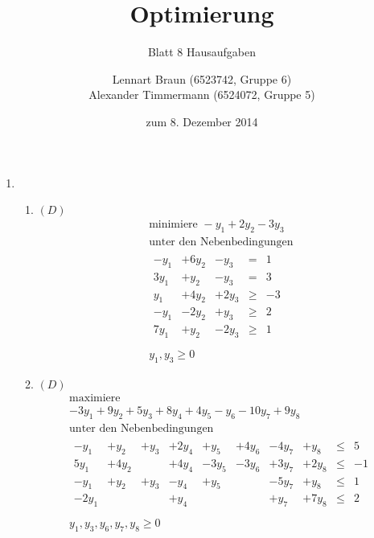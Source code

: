 \documentclass[a4paper]{scrartcl}
\title{Optimierung}
\subtitle{Blatt 8 Hausaufgaben}
\author{
	Lennart Braun (6523742, Gruppe 6) \\
    Alexander Timmermann (6524072, Gruppe 5)
}
\date{zum 8. Dezember 2014}
\begin{document}
\maketitle

\begin{enumerate}[label=\bfseries\arabic*.]
    \item %
        \begin{enumerate}
            \item $(D)$
                \begin{equation}
                    \begin{gathered}
                        \text{minimiere }
                        -y_1 +2y_2 -3y_3 \\
                        \text{unter den Nebenbedingungen} \\
                        \begin{array}{rrrcr}
                            -y_1 & +6y_2 & -y_3 & = & 1 \\
                            3y_1 & +y_2 & -y_3 & = & 3 \\
                            y_1 & +4y_2 & +2y_3 & \geq & -3 \\
                            -y_1 & -2y_2 & +y_3 & \geq & 2 \\
                            7y_1 & +y_2 & -2y_3 & \geq & 1 \\
                        \end{array} \\
                        y_1, y_3 \geq 0
                    \end{gathered}
                \end{equation}

            \item $(D)$
                \begin{equation}
                    \begin{gathered}
                        \text{maximiere} \\
                        -3y_1 +9y_2 +5y_3 +8y_4 +4y_5 -y_6 -10y_7 +9y_8 \\
                        \text{unter den Nebenbedingungen} \\
                        \begin{array}{rrrrrrrrcr}
                            -y_1 & +y_2 & +y_3 & +2y_4 & +y_5 & +4y_6 & -4y_7 & +y_8 & \leq & 5 \\
                            5y_1 & +4y_2 & & +4y_4 & -3y_5 & -3y_6 & +3y_7 & +2y_8 & \leq & -1 \\
                            -y_1 & +y_2 & +y_3 & -y_4 & +y_5 & & -5y_7 & +y_8 & \leq & 1 \\
                            -2y_1 & & & +y_4 & & & +y_7 & +7y_8 & \leq & 2 \\
                        \end{array} \\
                        y_1, y_3, y_6, y_7, y_8 \geq 0
                    \end{gathered}
                \end{equation}


\end{enumerate}
\end{enumerate}
\end{document}

